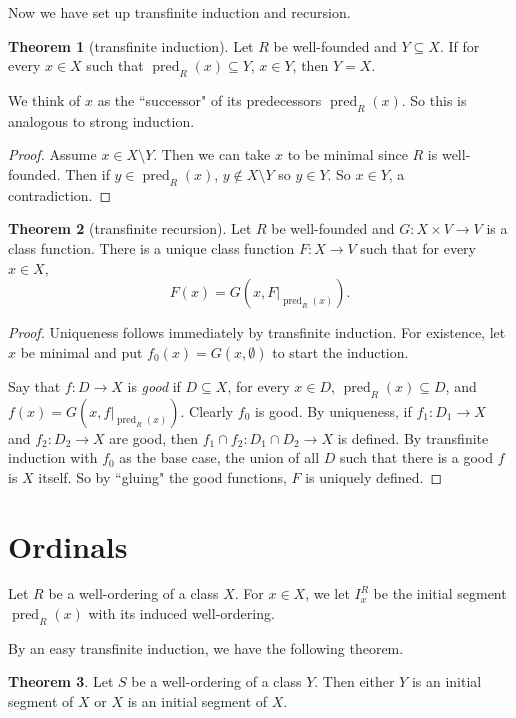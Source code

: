 \documentclass[12pt]{report}
\DeclareMathOperator{\pred}{pred}
\newcommand{\dfn}[1]{\emph{#1}\index{#1}}
\theoremstyle{definition}
\newtheorem{theorem}{Theorem}[chapter]
\begin{document}
    Now we have set up transfinite induction and recursion.
\begin{theorem}[transfinite induction]
    Let $R$ be well-founded and $Y \subseteq X$. If for every $x \in X$ such that $\pred_R(x) \subseteq Y$, $x \in Y$, then $Y = X$.
\end{theorem}
    We think of $x$ as the ``successor" of its predecessors $\pred_R(x)$. So this is analogous to strong induction.
\begin{proof}
    Assume $x \in X \setminus Y$. Then we can take $x$ to be minimal since $R$ is well-founded. Then if $y \in \pred_R(x)$, $y \notin X \setminus Y$ so $y \in Y$. So $x \in Y$, a contradiction.
\end{proof}
\begin{theorem}[transfinite recursion]
    Let $R$ be well-founded and $G: X \times V \to V$ is a class function. There is a unique class function $F: X \to V$ such that for every $x \in X$,
    $$F(x) = G(x, F|_{\pred_R(x)}).$$
\end{theorem}
\begin{proof}
    Uniqueness follows immediately by transfinite induction. For existence, let $x$ be minimal and put $f_0(x) = G(x, \emptyset)$ to start the induction.

    Say that $f: D \to X$ is \dfn{good} if $D \subseteq X$, for every $x \in D$, $\pred_R(x) \subseteq D$, and $f(x) = G(x, f|_{\pred_R(x)})$. Clearly $f_0$ is good. By uniqueness, if $f_1: D_1 \to X$ and $f_2: D_2 \to X$ are good, then $f_1\cap f_2: D_1 \cap D_2 \to X$ is defined. By transfinite induction with $f_0$ as the base case, the union of all $D$ such that there is a good $f$ is $X$ itself. So by ``gluing" the good functions, $F$ is uniquely defined.
\end{proof}

\section{Ordinals}
Let $R$ be a well-ordering of a class $X$. For $x \in X$, we let $I_x^R$ be the initial segment $\pred_R(x)$ with its induced well-ordering.

By an easy transfinite induction, we have the following theorem.
\begin{theorem}
    Let $S$ be a well-ordering of a class $Y$. Then either $Y$ is an initial segment of $X$ or $X$ is an initial segment of $X$.
\end{theorem}
\end{document}
